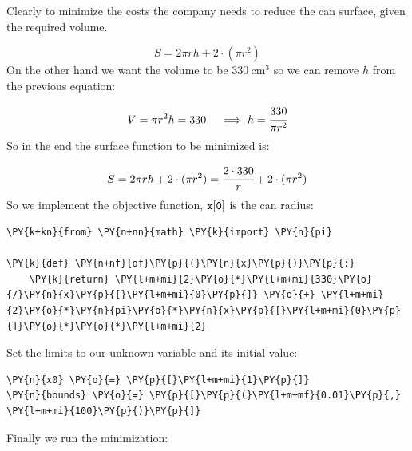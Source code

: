 Clearly to minimize the costs the company needs to reduce the can
surface, given the required volume.

\begin{equation} 
S = 2\pi rh + 2\cdot(\pi r^2) 
\end{equation}
On the other hand we want the volume to be \(330~\mathrm{cm}^3\) so we
can remove \(h\) from the previous equation:

\begin{equation} 
V = \pi r^2 h = 330\quad\implies h = \cfrac{330}{\pi r^2}
\end{equation}
So in the end the surface function to be minimized is:

\begin{equation}
S = 2\pi rh + 2\cdot(\pi r^2) = \cfrac{2\cdot 330}{r} + 2\cdot(\pi r^2)
\end{equation}
So we implement the objective function, \(\tt{x[0]}\) is the can radius:

\begin{tcolorbox}[breakable, size=fbox, boxrule=1pt, pad at break*=1mm,colback=cellbackground, colframe=cellborder]
\begin{Verbatim}[commandchars=\\\{\}]
\PY{k+kn}{from} \PY{n+nn}{math} \PY{k}{import} \PY{n}{pi}

\PY{k}{def} \PY{n+nf}{of}\PY{p}{(}\PY{n}{x}\PY{p}{)}\PY{p}{:}
    \PY{k}{return} \PY{l+m+mi}{2}\PY{o}{*}\PY{l+m+mi}{330}\PY{o}{/}\PY{n}{x}\PY{p}{[}\PY{l+m+mi}{0}\PY{p}{]} \PY{o}{+} \PY{l+m+mi}{2}\PY{o}{*}\PY{n}{pi}\PY{o}{*}\PY{n}{x}\PY{p}{[}\PY{l+m+mi}{0}\PY{p}{]}\PY{o}{*}\PY{o}{*}\PY{l+m+mi}{2}
\end{Verbatim}
\end{tcolorbox}

Set the limits to our unknown variable and its initial value:

\begin{tcolorbox}[breakable, size=fbox, boxrule=1pt, pad at break*=1mm,colback=cellbackground, colframe=cellborder]
\begin{Verbatim}[commandchars=\\\{\}]
\PY{n}{x0} \PY{o}{=} \PY{p}{[}\PY{l+m+mi}{1}\PY{p}{]}
\PY{n}{bounds} \PY{o}{=} \PY{p}{[}\PY{p}{(}\PY{l+m+mf}{0.01}\PY{p}{,} \PY{l+m+mi}{100}\PY{p}{)}\PY{p}{]}
\end{Verbatim}
\end{tcolorbox}

    Finally we run the minimization:

